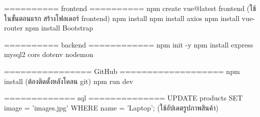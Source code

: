 ========== frontend ==========
npm create vue@latest frontend (ใช้ในขั้นตอนแรก สร้างโฟลเดอร์ frontend)
npm install 
npm install axios
npm install vue-router
npm install Bootstrap

========== backend ============
npm init -y
npm install express mysql2 cors dotenv nodemon


================ GitHub ===================
npm install (ต้องติดตั้งหลังโคลน git)
npm run dev


============= sql ==============
UPDATE products SET image = 'images.jpg' WHERE name = 'Laptop'; (ใช้อัปเดตรูปภาพสินค้า)